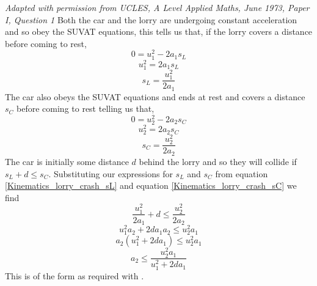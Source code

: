 

\begin{problem}[A1973AMIQ1p]
{ 
}
{\textit{Adapted with permission from UCLES, A Level Applied Maths, June 1973, Paper I, Question 1}}
{Both the car and the lorry are undergoing constant acceleration and so obey the SUVAT equations, this tells us that, if the lorry covers a distance  before coming to rest,
		\begin{equation*}0=u_1^2-2a_1s_L	\end{equation*}
		\begin{equation*}u_1^2=2a_1s_L	\end{equation*}
		\begin{equation}\label{Kinematics_lorry_crash_sL}s_L=\frac{u_1^2}{2a_1}	\end{equation}
	The car also obeys the SUVAT equations and ends at rest and covers a distance $s_C$ before coming to rest telling us that,
		\begin{equation*}0=u_2^2-2a_2s_C	\end{equation*}
		\begin{equation*}u_2^2=2a_2s_C	\end{equation*}
		\begin{equation}\label{Kinematics_lorry_crash_sC}s_C=\frac{u_2^2}{2a_2}	\end{equation}
	The car is initially some distance $d$ behind the lorry and so they will collide if $s_L+d\le s_C$. Substituting our expressions for $s_L$ and $s_C$ from equation \eqref{Kinematics_lorry_crash_sL} and equation \eqref{Kinematics_lorry_crash_sC} we find
		\begin{equation*}\frac{u_1^2}{2a_1}+d\le\frac{u_2^2}{2a_2}		\end{equation*}
		\begin{equation*}u_1^{2}a_2+2da_1a_2\le u_2^{2}a_1			\end{equation*}
		\begin{equation*}a_2\left(u_1^{2}+2da_1\right)\le u_2^{2}a_1		\end{equation*}
		\begin{equation*}a_2\le\frac{u_2^{2}a_1}{u_1^{2} + 2da_1}		\end{equation*}
	This is of the form  as required with .
}
\end{problem}